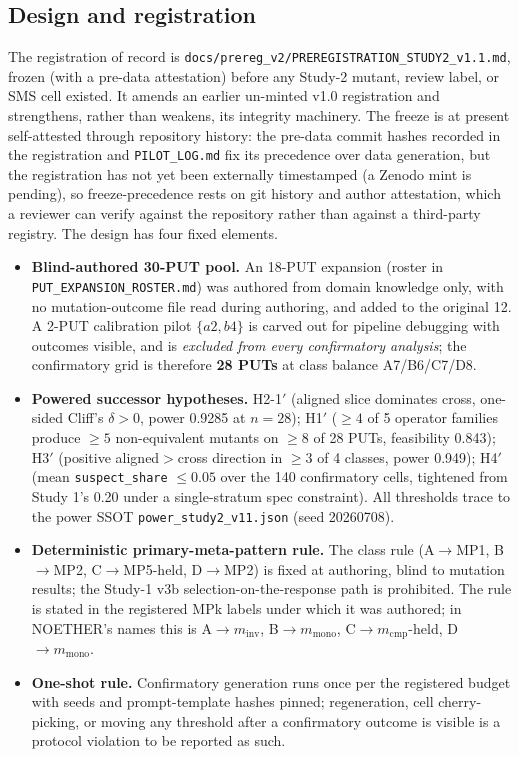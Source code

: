 \documentclass[manuscript,screen,review]{acmart}
\begin{document}
\subsection{Design and registration}\label{study2-design}

The registration of record is
\texttt{docs/prereg\_v2/PREREGISTRATION\_STUDY2\_v1.1.md}, frozen (with a
pre-data attestation) before any Study-2 mutant, review label, or SMS
cell existed. It amends an earlier un-minted v1.0 registration and
strengthens, rather than weakens, its integrity machinery. The freeze is
at present self-attested through repository history: the pre-data commit
hashes recorded in the registration and \texttt{PILOT\_LOG.md} fix its
precedence over data generation, but the registration has not yet been
externally timestamped (a Zenodo mint is pending), so freeze-precedence
rests on git history and author attestation, which a reviewer can verify
against the repository rather than against a third-party registry. The
design has four fixed elements.

\begin{itemize}

\item
  \textbf{Blind-authored 30-PUT pool.} An 18-PUT expansion (roster in
  \texttt{PUT\_EXPANSION\_ROSTER.md}) was authored from domain knowledge
  only, with no mutation-outcome file read during authoring, and added
  to the original 12. A 2-PUT calibration pilot \(\{a2, b4\}\) is carved
  out for pipeline debugging with outcomes visible, and is
  \emph{excluded from every confirmatory analysis}; the confirmatory
  grid is therefore \textbf{28 PUTs} at class balance A7/B6/C7/D8.
\item
  \textbf{Powered successor hypotheses.} H2-1\('\) (aligned slice
  dominates cross, one-sided Cliff's \(\delta > 0\), power 0.9285 at
  \(n = 28\)); H1\('\) (\(\geq 4\) of 5 operator families produce
  \(\geq 5\) non-equivalent mutants on \(\geq 8\) of 28 PUTs, feasibility
  0.843); H3\('\) (positive aligned\(>\)cross direction in \(\geq 3\) of
  4 classes, power 0.949); H4\('\) (mean \texttt{suspect\_share}
  \(\leq 0.05\) over the 140 confirmatory cells, tightened from Study
  1's 0.20 under a single-stratum spec constraint). All thresholds trace
  to the power SSOT \texttt{power\_study2\_v11.json} (seed 20260708).
\item
  \textbf{Deterministic primary-meta-pattern rule.} The class rule
  (A\(\to\)MP1, B\(\to\)MP2, C\(\to\)MP5-held, D\(\to\)MP2) is fixed at
  authoring, blind to mutation results; the Study-1 v3b
  selection-on-the-response path is prohibited. The rule is stated in the
  registered MPk labels under which it was authored; in NOETHER's names this
  is A\(\to m_{\mathrm{inv}}\), B\(\to m_{\mathrm{mono}}\),
  C\(\to m_{\mathrm{cmp}}\)-held, D\(\to m_{\mathrm{mono}}\).
\item
  \textbf{One-shot rule.} Confirmatory generation runs once per the
  registered budget with seeds and prompt-template hashes pinned;
  regeneration, cell cherry-picking, or moving any threshold after a
  confirmatory outcome is visible is a protocol violation to be reported
  as such.
\end{itemize}
\end{document}
